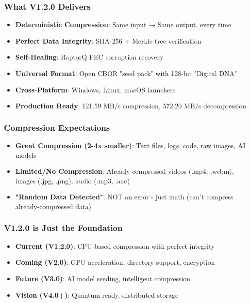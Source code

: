 \documentclass[11pt,a4paper]{article}
\begin{document}
	\subsubsection{What V1.2.0 Delivers}
	\begin{itemize}
		\item \textbf{Deterministic Compression}: Same input → Same output, every time
		\item \textbf{Perfect Data Integrity}: SHA-256 + Merkle tree verification
		\item \textbf{Self-Healing}: RaptorQ FEC corruption recovery
		\item \textbf{Universal Format}: Open CBOR "seed pack" with 128-bit "Digital DNA"
		\item \textbf{Cross-Platform}: Windows, Linux, macOS launchers
		\item \textbf{Production Ready}: 121.59 MB/s compression, 572.20 MB/s decompression
	\end{itemize}
	
	\subsubsection{Compression Expectations}
	\begin{itemize}
		\item \textbf{Great Compression (2-4x smaller)}: Text files, logs, code, raw images, AI models
		\item \textbf{Limited/No Compression}: Already-compressed videos (.mp4, .webm), images (.jpg, .png), audio (.mp3, .aac)
		\item \textbf{"Random Data Detected"}: NOT an error - just math (can't compress already-compressed data)
	\end{itemize}
	
	\subsubsection{V1.2.0 is Just the Foundation}
	\begin{itemize}
		\item \textbf{Current (V1.2.0)}: CPU-based compression with perfect integrity
		\item \textbf{Coming (V2.0)}: GPU acceleration, directory support, encryption
		\item \textbf{Future (V3.0)}: AI model seeding, intelligent compression
		\item \textbf{Vision (V4.0+)}: Quantum-ready, distributed storage
	\end{itemize}
	
\end{document}
